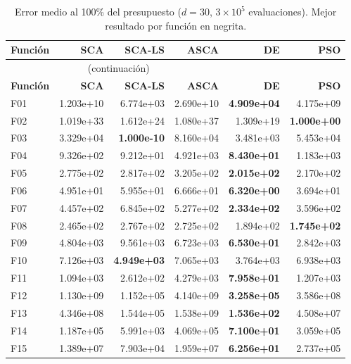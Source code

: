 \documentclass[12pt,a4paper]{article}
\begin{document}
\begin{longtable}{lrrrrr}
\caption{Error medio al 100\% del presupuesto ($d=30$, $3\times10^5$ evaluaciones). Mejor resultado por función en negrita.}
\label{tab:resultados_sca_ls_d30}\\
\toprule
\textbf{Función} & \textbf{SCA} & \textbf{SCA-LS} & \textbf{ASCA} & \textbf{DE} & \textbf{PSO} \\
\midrule
\endfirsthead
\multicolumn{4}{c}{\tablename~\thetable{} (continuación)}\\
\toprule
\textbf{Función} & \textbf{SCA} & \textbf{SCA-LS} & \textbf{ASCA} & \textbf{DE} & \textbf{PSO} \\
\midrule
\endhead
\midrule
\endfoot
\bottomrule
\endlastfoot
F01  & 1.203e+10 & 6.774e+03 & 2.690e+10 & \textbf{4.909e+04} & 4.175e+09 \\
F02  & 1.019e+33 & 1.612e+24 & 1.080e+37 & 1.309e+19 & \textbf{1.000e+00} \\
F03  & 3.329e+04 & \textbf{1.000e-10} & 8.160e+04 & 3.481e+03 & 5.453e+04 \\
F04  & 9.326e+02 & 9.212e+01 & 4.921e+03 & \textbf{8.430e+01} & 1.183e+03 \\
F05  & 2.775e+02 & 2.817e+02 & 3.205e+02 & \textbf{2.015e+02} & 2.170e+02 \\
F06  & 4.951e+01 & 5.955e+01 & 6.666e+01 & \textbf{6.320e+00} & 3.694e+01 \\
F07  & 4.457e+02 & 6.845e+02 & 5.277e+02 & \textbf{2.334e+02} & 3.596e+02 \\
F08  & 2.465e+02 & 2.767e+02 & 2.725e+02 & 1.894e+02 & \textbf{1.745e+02} \\
F09  & 4.804e+03 & 9.561e+03 & 6.723e+03 & \textbf{6.530e+01} & 2.842e+03 \\
F10  & 7.126e+03 & \textbf{4.949e+03} & 7.065e+03 & 3.764e+03 & 6.938e+03 \\
F11  & 1.094e+03 & 2.612e+02 & 4.279e+03 & \textbf{7.958e+01} & 1.207e+03 \\
F12  & 1.130e+09 & 1.152e+05 & 4.140e+09 & \textbf{3.258e+05} & 3.586e+08 \\
F13  & 4.346e+08 & 1.544e+05 & 1.538e+09 & \textbf{1.536e+02} & 4.508e+07 \\
F14  & 1.187e+05 & 5.991e+03 & 4.069e+05 & \textbf{7.100e+01} & 3.059e+05 \\
F15  & 1.389e+07 & 7.903e+04 & 1.959e+07 & \textbf{6.256e+01} & 2.737e+05 \\

\end{longtable}
\end{document}
